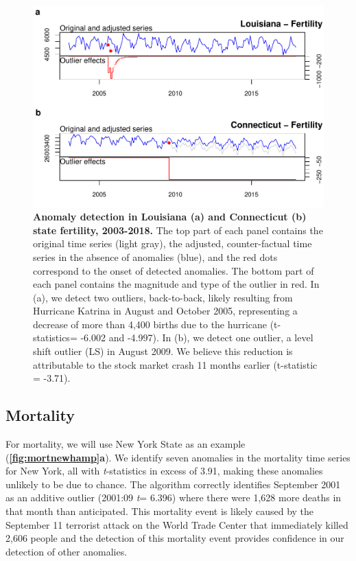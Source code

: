\documentclass[12pt]{article}
\begin{document}
\begin{figure}
\centering
\includegraphics{MainDocument_files/figure-latex/FertilityAnomalies-1.pdf}
\caption{\textbf{Anomaly detection in Louisiana (a) and Connecticut (b) state fertility, 2003-2018.}
The top part of each panel contains the original time series (light
gray), the adjusted, counter-factual time series in the absence of
anomalies (blue), and the red dots correspond to the onset of detected
anomalies. The bottom part of each panel contains the magnitude and type
of the outlier in red. In (a), we detect two outliers, back-to-back,
likely resulting from Hurricane Katrina in August and October 2005,
representing a decrease of more than 4,400 births due to the hurricane
(t-statistics= -6.002 and -4.997). In (b), we detect one outlier, a
level shift outlier (LS) in August 2009. We believe this reduction is
attributable to the stock market crash 11 months earlier (t-statistic =
-3.71). \label{fig:fertla}}
\end{figure}

\hypertarget{mortality}{%
\subsection{Mortality}\label{mortality}}

For mortality, we will use New York State as an example
(\textbf{\autoref{fig:mortnewhamp}a}). We identify seven anomalies in
the mortality time series for New York, all with \emph{t}-statistics in
excess of 3.91, making these anomalies unlikely to be due to chance. The
algorithm correctly identifies September 2001 as an additive outlier
(2001:09 \emph{t}= 6.396) where there were 1,628 more deaths in that
month than anticipated. This mortality event is likely caused by the
September 11 terrorist attack on the World Trade Center that immediately
killed 2,606 people and the detection of this mortality event provides
confidence in our detection of other anomalies.
\end{document}

